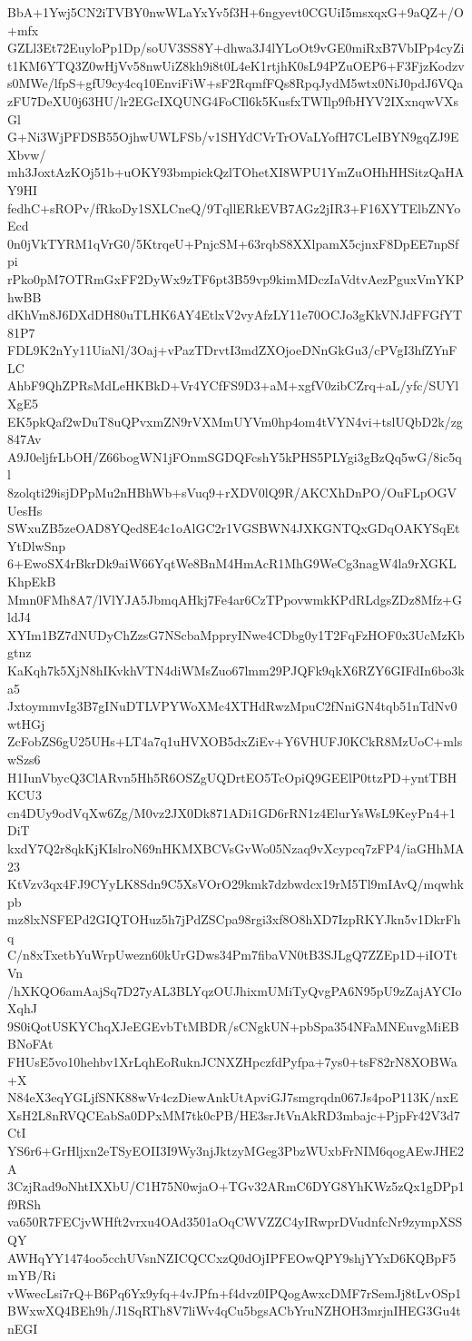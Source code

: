 BbA+1Ywj5CN2iTVBY0nwWLaYxYv5f3H+6ngyevt0CGUiI5msxqxG+9aQZ+/O+mfx
GZLl3Et72EuyloPp1Dp/soUV3SS8Y+dhwa3J4lYLoOt9vGE0miRxB7VbIPp4cyZi
t1KM6YTQ3Z0wHjVv58nwUiZ8kh9i8t0L4eK1rtjhK0sL94PZuOEP6+F3FjzKodzv
s0MWe/lfpS+gfU9cy4cq10EnviFiW+sF2RqmfFQs8RpqJydM5wtx0NiJ0pdJ6VQa
zFU7DeXU0j63HU/lr2EGcIXQUNG4FoCIl6k5KusfxTWIlp9fbHYV2IXxnqwVXsGl
G+Ni3WjPFDSB55OjhwUWLFSb/v1SHYdCVrTrOVaLYofH7CLeIBYN9gqZJ9EXbvw/
mh3JoxtAzKOj51b+uOKY93bmpickQzlTOhetXI8WPU1YmZuOHhHHSitzQaHAY9HI
fedhC+sROPv/fRkoDy1SXLCneQ/9TqllERkEVB7AGz2jIR3+F16XYTElbZNYoEcd
0n0jVkTYRM1qVrG0/5KtrqeU+PnjcSM+63rqbS8XXlpamX5cjnxF8DpEE7npSfpi
rPko0pM7OTRmGxFF2DyWx9zTF6pt3B59vp9kimMDczIaVdtvAezPguxVmYKPhwBB
dKhVm8J6DXdDH80uTLHK6AY4EtlxV2vyAfzLY11e70OCJo3gKkVNJdFFGfYT81P7
FDL9K2nYy11UiaNl/3Oaj+vPazTDrvtI3mdZXOjoeDNnGkGu3/cPVgI3hfZYnFLC
AhbF9QhZPRsMdLeHKBkD+Vr4YCfFS9D3+aM+xgfV0zibCZrq+aL/yfc/SUYlXgE5
EK5pkQaf2wDuT8uQPvxmZN9rVXMmUYVm0hp4om4tVYN4vi+tslUQbD2k/zg847Av
A9J0eljfrLbOH/Z66bogWN1jFOnmSGDQFcshY5kPHS5PLYgi3gBzQq5wG/8ic5ql
8zolqti29isjDPpMu2nHBhWb+sVuq9+rXDV0lQ9R/AKCXhDnPO/OuFLpOGVUesHs
SWxuZB5zeOAD8YQed8E4c1oAlGC2r1VGSBWN4JXKGNTQxGDqOAKYSqEtYtDlwSnp
6+EwoSX4rBkrDk9aiW66YqtWe8BnM4HmAcR1MhG9WeCg3nagW4la9rXGKLKhpEkB
Mmn0FMh8A7/lVlYJA5JbmqAHkj7Fe4ar6CzTPpovwmkKPdRLdgsZDz8Mfz+GldJ4
XYIm1BZ7dNUDyChZzsG7NScbaMppryINwe4CDbg0y1T2FqFzHOF0x3UcMzKbgtnz
KaKqh7k5XjN8hIKvkhVTN4diWMsZuo67lmm29PJQFk9qkX6RZY6GIFdIn6bo3ka5
JxtoymmvIg3B7gINuDTLVPYWoXMc4XTHdRwzMpuC2fNniGN4tqb51nTdNv0wtHGj
ZcFobZS6gU25UHs+LT4a7q1uHVXOB5dxZiEv+Y6VHUFJ0KCkR8MzUoC+mlswSzs6
H1IunVbycQ3ClARvn5Hh5R6OSZgUQDrtEO5TcOpiQ9GEElP0ttzPD+yntTBHKCU3
cn4DUy9odVqXw6Zg/M0vz2JX0Dk871ADi1GD6rRN1z4ElurYsWsL9KeyPn4+1DiT
kxdY7Q2r8qkKjKIslroN69nHKMXBCVsGvWo05Nzaq9vXcypcq7zFP4/iaGHhMA23
KtVzv3qx4FJ9CYyLK8Sdn9C5XsVOrO29kmk7dzbwdcx19rM5Tl9mIAvQ/mqwhkpb
mz8lxNSFEPd2GIQTOHuz5h7jPdZSCpa98rgi3xf8O8hXD7IzpRKYJkn5v1DkrFhq
C/n8xTxetbYuWrpUwezn60kUrGDws34Pm7fibaVN0tB3SJLgQ7ZZEp1D+iIOTtVn
/hXKQO6amAajSq7D27yAL3BLYqzOUJhixmUMiTyQvgPA6N95pU9zZajAYCIoXqhJ
9S0iQotUSKYChqXJeEGEvbTtMBDR/sCNgkUN+pbSpa354NFaMNEuvgMiEBBNoFAt
FHUsE5vo10hehbv1XrLqhEoRuknJCNXZHpczfdPyfpa+7ys0+tsF82rN8XOBWa+X
N84eX3eqYGLjfSNK88wVr4czDiewAnkUtApviGJ7smgrqdn067Js4poP113K/nxE
XsH2L8nRVQCEabSa0DPxMM7tk0cPB/HE3srJtVnAkRD3mbajc+PjpFr42V3d7CtI
YS6r6+GrHljxn2eTSyEOII3I9Wy3njJktzyMGeg3PbzWUxbFrNIM6qogAEwJHE2A
3CzjRad9oNhtIXXbU/C1H75N0wjaO+TGv32ARmC6DYG8YhKWz5zQx1gDPp1f9RSh
va650R7FECjvWHft2vrxu4OAd3501aOqCWVZZC4yIRwprDVudnfcNr9zympXSSQY
AWHqYY1474oo5cchUVsnNZICQCCxzQ0dOjIPFEOwQPY9shjYYxD6KQBpF5mYB/Ri
vWwecLsi7rQ+B6Pq6Yx9yfq+4vJPfn+f4dvz0IPQogAwxcDMF7rSemJj8tLvOSp1
BWxwXQ4BEh9h/J1SqRTh8V7liWv4qCu5bgsACbYruNZHOH3mrjnIHEG3Gu4tnEGI
